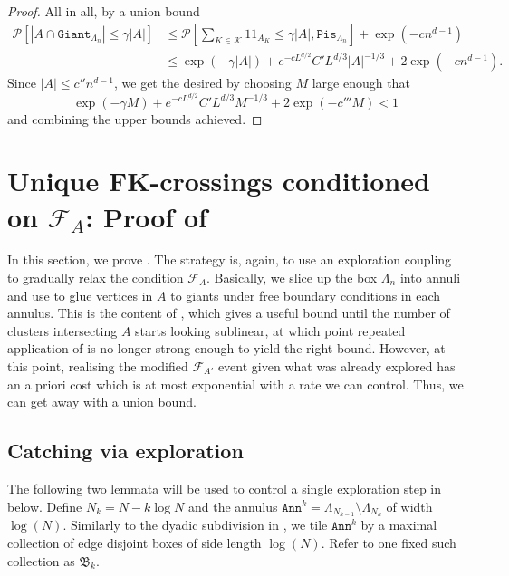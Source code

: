 \documentclass[article,11pt,reqno]{amsart}
\newcommand{\id}{1\! \!1}
\newcommand{\ak}{\mathtt{Ann}^k}
\begin{document}
\begin{appendix}
\begin{proof}
All in all, %
by a union bound
\begin{align*}
\mathscr{P}[|A\cap \mathtt{Giant}_{\Lambda_{n}}|\leq \gamma |A|]&\leq
\mathscr{P}[ \sum_{K\in \mathcal{K}} \id_{A_K}\leq \gamma|A| ,\mathtt{Pis}_{\Lambda_n}] +\exp(-cn^{d-1})\\
&\leq \exp(-\gamma |A|)+e^{-cL^{d/2}}C' L^{d/3} |A|^{-1/3}+2\exp(-cn^{d-1}). 
\end{align*}
Since $|A|\leq c'' n^{d-1}$, we get the desired by choosing $M$  large enough that
$$
\exp(-\gamma M)+e^{-cL^{d/2}}C' L^{d/3} M^{-1/3}+2\exp(-c'''M)< 1
$$
and combining the upper bounds achieved.
\end{proof}





\section{Unique FK-crossings conditioned on \texorpdfstring{$\mathcal{F}_A$}{F\_A}: Proof of \texorpdfstring{}{Proposition \ref*{proposition:unique_crossing_with_fa_old_version}}}
\label{sec:Catch}

In this section, we prove . The strategy is, again, to use an exploration coupling to gradually relax the condition $\mathcal{F}_A$. Basically, we slice up the box $\Lambda_n$ into annuli and use  to glue vertices in $A$ to giants under free boundary conditions in each annulus. This is the content of , which gives a useful bound until the number of clusters intersecting $A$ starts looking sublinear, at which point repeated application of  is no longer strong enough to yield the right bound. However, at this point, realising the modified $\mathcal{F}_{A'}$ event given what was already explored has an a priori cost which is at most exponential with a rate we can control. Thus, we can get away with a union bound. 

\subsection{Catching via exploration} 


The following two lemmata will be used to control a single exploration step in  below.  Define $N_k=N-k\log N$  and the annulus $\mathtt{Ann}^k=\Lambda_{N_{k-1}}\setminus \Lambda_{N_k}$
of width $\log(N)$. Similarly to the dyadic subdivision in , we tile $\ak$ by a maximal collection of edge disjoint boxes of side length $\log(N)$. Refer to one fixed such collection as $\mathfrak{B}_k$.  


\end{appendix}
\end{document}
